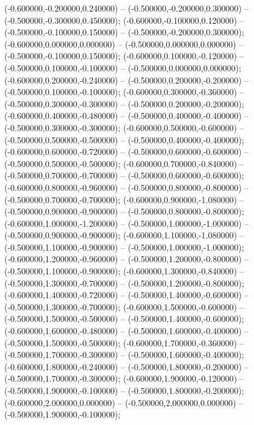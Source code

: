  (-0.600000,-0.200000,0.240000) -- (-0.500000,-0.200000,0.300000) -- (-0.500000,-0.300000,0.450000);
 (-0.600000,-0.100000,0.120000) -- (-0.500000,-0.100000,0.150000) -- (-0.500000,-0.200000,0.300000);
 (-0.600000,0.000000,0.000000) -- (-0.500000,0.000000,0.000000) -- (-0.500000,-0.100000,0.150000);
 (-0.600000,0.100000,-0.120000) -- (-0.500000,0.100000,-0.100000) -- (-0.500000,0.000000,0.000000);
 (-0.600000,0.200000,-0.240000) -- (-0.500000,0.200000,-0.200000) -- (-0.500000,0.100000,-0.100000);
 (-0.600000,0.300000,-0.360000) -- (-0.500000,0.300000,-0.300000) -- (-0.500000,0.200000,-0.200000);
 (-0.600000,0.400000,-0.480000) -- (-0.500000,0.400000,-0.400000) -- (-0.500000,0.300000,-0.300000);
 (-0.600000,0.500000,-0.600000) -- (-0.500000,0.500000,-0.500000) -- (-0.500000,0.400000,-0.400000);
 (-0.600000,0.600000,-0.720000) -- (-0.500000,0.600000,-0.600000) -- (-0.500000,0.500000,-0.500000);
 (-0.600000,0.700000,-0.840000) -- (-0.500000,0.700000,-0.700000) -- (-0.500000,0.600000,-0.600000);
 (-0.600000,0.800000,-0.960000) -- (-0.500000,0.800000,-0.800000) -- (-0.500000,0.700000,-0.700000);
 (-0.600000,0.900000,-1.080000) -- (-0.500000,0.900000,-0.900000) -- (-0.500000,0.800000,-0.800000);
 (-0.600000,1.000000,-1.200000) -- (-0.500000,1.000000,-1.000000) -- (-0.500000,0.900000,-0.900000);
 (-0.600000,1.100000,-1.080000) -- (-0.500000,1.100000,-0.900000) -- (-0.500000,1.000000,-1.000000);
 (-0.600000,1.200000,-0.960000) -- (-0.500000,1.200000,-0.800000) -- (-0.500000,1.100000,-0.900000);
 (-0.600000,1.300000,-0.840000) -- (-0.500000,1.300000,-0.700000) -- (-0.500000,1.200000,-0.800000);
 (-0.600000,1.400000,-0.720000) -- (-0.500000,1.400000,-0.600000) -- (-0.500000,1.300000,-0.700000);
 (-0.600000,1.500000,-0.600000) -- (-0.500000,1.500000,-0.500000) -- (-0.500000,1.400000,-0.600000);
 (-0.600000,1.600000,-0.480000) -- (-0.500000,1.600000,-0.400000) -- (-0.500000,1.500000,-0.500000);
 (-0.600000,1.700000,-0.360000) -- (-0.500000,1.700000,-0.300000) -- (-0.500000,1.600000,-0.400000);
 (-0.600000,1.800000,-0.240000) -- (-0.500000,1.800000,-0.200000) -- (-0.500000,1.700000,-0.300000);
 (-0.600000,1.900000,-0.120000) -- (-0.500000,1.900000,-0.100000) -- (-0.500000,1.800000,-0.200000);
 (-0.600000,2.000000,0.000000) -- (-0.500000,2.000000,0.000000) -- (-0.500000,1.900000,-0.100000);
